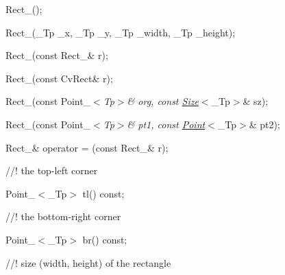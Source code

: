 {\ttfamily }

{\ttfamily }

{\ttfamily Rect\+\_\+();}

{\ttfamily }

{\ttfamily }

{\ttfamily Rect\+\_\+(\+\_\+\+Tp \+\_\+x, \+\_\+\+Tp \+\_\+y, \+\_\+\+Tp \+\_\+width, \+\_\+\+Tp \+\_\+height);}

{\ttfamily }

{\ttfamily }

{\ttfamily Rect\+\_\+(const Rect\+\_\+\& r);}

{\ttfamily }

{\ttfamily }

{\ttfamily Rect\+\_\+(const Cv\+Rect\& r);}

{\ttfamily }

{\ttfamily }

{\ttfamily Rect\+\_\+(const Point\+\_\+$<${\itshape Tp$>$\& org, const \mbox{\hyperlink{classorg_1_1opencv_1_1core_1_1_size}{Size}}}$<$\+\_\+\+Tp$>$\& sz);}

{\ttfamily }

{\ttfamily }

{\ttfamily Rect\+\_\+(const Point\+\_\+$<${\itshape Tp$>$\& pt1, const \mbox{\hyperlink{classorg_1_1opencv_1_1core_1_1_point}{Point}}}$<$\+\_\+\+Tp$>$\& pt2);}

{\ttfamily }

{\ttfamily }

{\ttfamily Rect\+\_\+\& operator = (const Rect\+\_\+\& r);}

{\ttfamily }

{\ttfamily }

{\ttfamily //! the top-\/left corner}

{\ttfamily }

{\ttfamily }

{\ttfamily Point\+\_\+$<$\+\_\+\+Tp$>$ tl() const;}

{\ttfamily }

{\ttfamily }

{\ttfamily //! the bottom-\/right corner}

{\ttfamily }

{\ttfamily }

{\ttfamily Point\+\_\+$<$\+\_\+\+Tp$>$ br() const;}

{\ttfamily }

{\ttfamily }

{\ttfamily //! size (width, height) of the rectangle}

